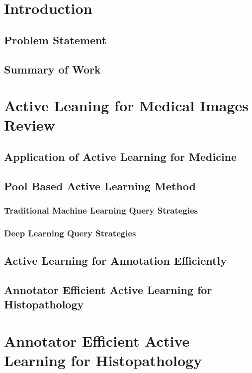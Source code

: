\section{Introduction}

\subsection{Problem Statement}

\subsection{Summary of Work}



\section{Active Leaning for Medical Images Review}

\subsection{Application of Active Learning for Medicine}

\subsection{Pool Based Active Learning Method}

\subsubsection{Traditional Machine Learning Query Strategies}

\subsubsection{Deep Learning Query Strategies}

\subsection{Active Learning for Annotation Efficiently}

\subsection{Annotator Efficient Active Learning for Histopathology}



\newpage
\section{Annotator Efficient Active Learning for Histopathology}

